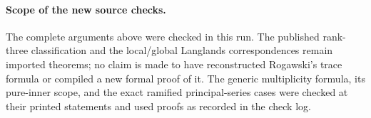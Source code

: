 \paragraph{Scope of the new source checks.}
The complete arguments above were checked in this run. The
published rank-three classification and the local/global
Langlands correspondences remain imported theorems; no claim
is made to have reconstructed Rogawski's trace formula or
compiled a new formal proof of it. The generic multiplicity
formula, its pure-inner scope, and the exact ramified
principal-series cases were checked at their printed
statements and used proofs as recorded in the check log.
